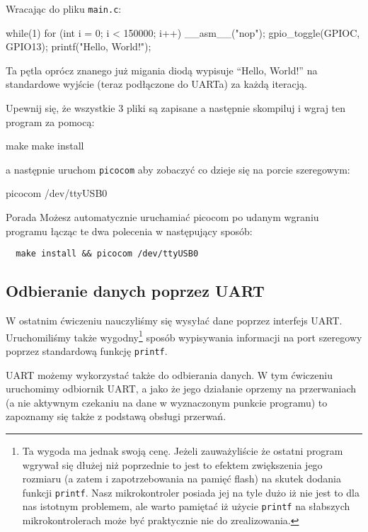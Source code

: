 \documentclass{pdfBooklets}
\begin{document}
Wracając do pliku \Verb$main.c$:

\begin{CodeFrame*}[c]{}
  while(1){
    for (int i = 0; i < 150000; i++) __asm__("nop");
    gpio_toggle(GPIOC, GPIO13);
    printf("Hello, World!\n");
  }
\end{CodeFrame*}

Ta pętla oprócz znanego już migania diodą wypisuje ``Hello, World!'' na standardowe wyjście (teraz podłączone do UARTa) za każdą iteracją.


Upewnij się, że wszystkie 3 pliki są zapisane a następnie skompiluj i wgraj ten program za pomocą:

\begin{CodeFrame*}[bash]{}
  make
  make install
\end{CodeFrame*}

a następnie uruchom \Verb$picocom$ aby zobaczyć co dzieje się na porcie szeregowym:

\begin{CodeFrame*}[bash]{}
  picocom /dev/ttyUSB0
\end{CodeFrame*}

\begin{ProTip}{Porada}
  Możesz automatycznie uruchamiać picocom po udanym wgraniu programu łącząc te dwa polecenia w następujący sposób:
  \begin{verbatim}
  make install && picocom /dev/ttyUSB0
  \end{verbatim}
\end{ProTip}

\subsection{Odbieranie danych poprzez UART}

W ostatnim ćwiczeniu nauczyliśmy się wysyłać dane poprzez interfejs UART. Uruchomiliśmy także wygodny\footnote{
	Ta wygoda ma jednak swoją cenę.
	Jeżeli zauważyliście że ostatni program wgrywał się dłużej niż poprzednie to jest to efektem zwiększenia jego rozmiaru (a zatem i zapotrzebowania na pamięć flash) na skutek dodania funkcji \Verb$printf$.
	Nasz mikrokontroler posiada jej na tyle dużo iż nie jest to dla nas istotnym problemem, ale warto pamiętać iż użycie \Verb$printf$ na słabszych mikrokontrolerach może być praktycznie nie do zrealizowania.
}
sposób wypisywania informacji na port szeregowy poprzez standardową funkcję \Verb$printf$.

UART możemy wykorzystać także do odbierania danych. W tym ćwiczeniu uruchomimy odbiornik UART, a jako że jego działanie oprzemy na przerwaniach (a nie aktywnym czekaniu na dane w wyznaczonym punkcie programu) to zapoznamy się także z podstawą obsługi przerwań.
\end{document}
